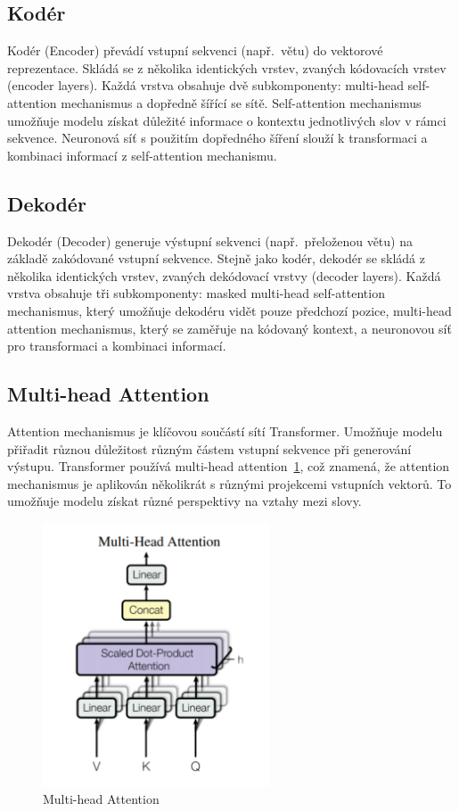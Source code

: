 \subsection{Kodér}
Kodér (Encoder) převádí vstupní sekvenci (např.\ větu) do vektorové reprezentace.
Skládá se z několika identických vrstev, zvaných kódovacích vrstev (encoder layers).
Každá vrstva obsahuje dvě subkomponenty: multi-head self-attention mechanismus a dopředně šířící se sítě.
Self-attention mechanismus umožňuje modelu získat důležité informace o kontextu jednotlivých slov v rámci sekvence.
Neuronová síť s použitím dopředného šíření slouží k transformaci a kombinaci informací z self-attention mechanismu.

\subsection{Dekodér}
Dekodér (Decoder) generuje výstupní sekvenci (např.\ přeloženou větu) na základě zakódované vstupní sekvence.
Stejně jako kodér, dekodér se skládá z několika identických vrstev, zvaných dekódovací vrstvy (decoder layers).
Každá vrstva obsahuje tři subkomponenty: masked multi-head self-attention mechanismus, který umožňuje dekodéru vidět pouze předchozí pozice, multi-head attention mechanismus, který se zaměřuje na kódovaný kontext, a neuronovou síť pro transformaci a kombinaci informací.

\subsection{Multi-head Attention}
Attention mechanismus je klíčovou součástí sítí Transformer.
Umožňuje modelu přiřadit různou důležitost různým částem vstupní sekvence při generování výstupu.
Transformer používá multi-head attention~\ref{fig:Multi Head Attention}, což znamená, že attention mechanismus je aplikován několikrát s různými projekcemi vstupních vektorů.
To umožňuje modelu získat různé perspektivy na vztahy mezi slovy.

\begin{figure}[H]
	\centering
	\includegraphics[width=0.6\textwidth]{Figures/multi_head_attention.png}
	\caption{Multi-head Attention~\cite{link25}}\label{fig:Multi Head Attention}
\end{figure}

